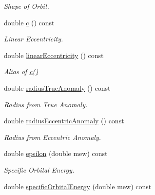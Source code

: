 \begin{DoxyCompactItemize}
\begin{DoxyCompactList}\small\item\em Shape of Orbit. \end{DoxyCompactList}\item 
double \hyperlink{class_orbit3_d_a0660f58758e1461d7aaeff2684a950bd}{c} () const 
\begin{DoxyCompactList}\small\item\em Linear Eccentricity. \end{DoxyCompactList}\item 
\hypertarget{class_orbit3_d_a5eab9920c3c0a9adc716556e3a08f264}{double \hyperlink{class_orbit3_d_a5eab9920c3c0a9adc716556e3a08f264}{linear\+Eccentricity} () const }\label{class_orbit3_d_a5eab9920c3c0a9adc716556e3a08f264}

\begin{DoxyCompactList}\small\item\em Alias of \hyperlink{class_orbit3_d_a0660f58758e1461d7aaeff2684a950bd}{c()} \end{DoxyCompactList}\item 
\hypertarget{class_orbit3_d_aea1e7cfdd6e5709e3fe2dee8bf8aa33f}{double \hyperlink{class_orbit3_d_aea1e7cfdd6e5709e3fe2dee8bf8aa33f}{radius\+True\+Anomaly} () const }\label{class_orbit3_d_aea1e7cfdd6e5709e3fe2dee8bf8aa33f}

\begin{DoxyCompactList}\small\item\em Radius from True Anomaly. \end{DoxyCompactList}\item 
\hypertarget{class_orbit3_d_a7cb7c8c7777c4f208c1d586bab835be2}{double \hyperlink{class_orbit3_d_a7cb7c8c7777c4f208c1d586bab835be2}{radius\+Eccentric\+Anomaly} () const }\label{class_orbit3_d_a7cb7c8c7777c4f208c1d586bab835be2}

\begin{DoxyCompactList}\small\item\em Radius from Eccentric Anomaly. \end{DoxyCompactList}\item 
\hypertarget{class_orbit3_d_ada50a0694411e68f1a51ff62b3b63e91}{double \hyperlink{class_orbit3_d_ada50a0694411e68f1a51ff62b3b63e91}{epsilon} (double mew) const }\label{class_orbit3_d_ada50a0694411e68f1a51ff62b3b63e91}

\begin{DoxyCompactList}\small\item\em Specific Orbital Energy. \end{DoxyCompactList}\item 
\hypertarget{class_orbit3_d_acb4d6e994731789b845f077e1da67d36}{double \hyperlink{class_orbit3_d_acb4d6e994731789b845f077e1da67d36}{specific\+Orbital\+Energy} (double mew) const }\label{class_orbit3_d_acb4d6e994731789b845f077e1da67d36}


\end{DoxyCompactItemize}
